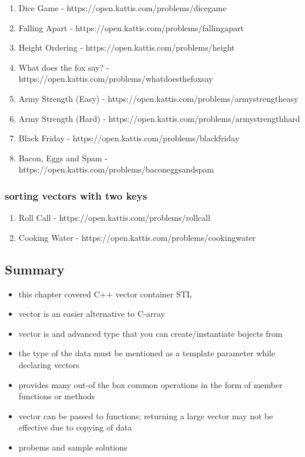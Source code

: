 \documentclass[11pt]{article}
\providecommand{\tightlist}{%
      \setlength{\itemsep}{0pt}\setlength{\parskip}{0pt}}
\begin{document}
\begin{enumerate}
\def\labelenumi{\arabic{enumi}.}
\tightlist
\item
  Dice Game - https://open.kattis.com/problems/dicegame
\item
  Falling Apart - https://open.kattis.com/problems/fallingapart
\item
  Height Ordering - https://open.kattis.com/problems/height
\item
  What does the fox say? -
  https://open.kattis.com/problems/whatdoesthefoxsay
\item
  Army Strength (Easy) -
  https://open.kattis.com/problems/armystrengtheasy
\item
  Army Strength (Hard) -
  https://open.kattis.com/problems/armystrengthhard
\item
  Black Friday - https://open.kattis.com/problems/blackfriday
\item
  Bacon, Eggs and Spam -
  https://open.kattis.com/problems/baconeggsandspam
\end{enumerate}

\hypertarget{sorting-vectors-with-two-keys}{%
\subsubsection{sorting vectors with two
keys}\label{sorting-vectors-with-two-keys}}

\begin{enumerate}
\def\labelenumi{\arabic{enumi}.}
\tightlist
\item
  Roll Call - https://open.kattis.com/problems/rollcall
\item
  Cooking Water - https://open.kattis.com/problems/cookingwater
\end{enumerate}

    \hypertarget{summary}{%
\subsection{Summary}\label{summary}}

\begin{itemize}
\tightlist
\item
  this chapter covered C++ vector container STL
\item
  vector is an easier alternative to C-array
\item
  vector is and advanced type that you can create/instantiate bojects
  from
\item
  the type of the data must be mentioned as a template parameter while
  declaring vectors
\item
  provides many out-of the box common operations in the form of member
  functions or methods
\item
  vector can be passed to functions; returning a large vector may not be
  effective due to copying of data
\item
  probems and sample solutions
\end{itemize}
\end{document}
